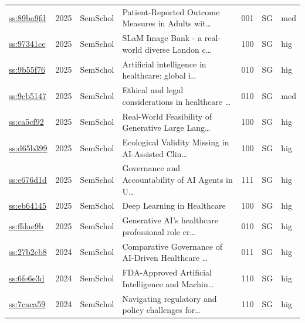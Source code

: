 \begin{table}[p]
\begin{tabularx}{\linewidth}{p{2.2cm} c p{1.4cm} X c p{1cm} p{0.7cm}}
  \href{https://www.semanticscholar.org/paper/89ba9fde2bde295010720131d28cc52f90bda918}{ss:89ba9fd} & 2025 & SemSchol & Patient-Reported Outcome Measures in Adults wit\ldots & 001 & SG & med \\
  \href{https://www.semanticscholar.org/paper/97341ce214d3ee6ff38797b0d31902728279283e}{ss:97341ce} & 2025 & SemSchol & SLaM Image Bank - a real-world diverse London c\ldots & 100 & SG & hig \\
  \href{https://www.semanticscholar.org/paper/9b55f763dac5f72478d0a0cd3b4c8ee4fc8fe3e8}{ss:9b55f76} & 2025 & SemSchol & Artificial intelligence in healthcare: global i\ldots & 010 & SG & hig \\
  \href{https://www.semanticscholar.org/paper/9cb51471e41ddaeaae6f93513f4ce20128248cfd}{ss:9cb5147} & 2025 & SemSchol & Ethical and legal considerations in healthcare \ldots & 010 & SG & med \\
  \href{https://www.semanticscholar.org/paper/ca5cf9264d753c39a709603f8248c048b35de3bf}{ss:ca5cf92} & 2025 & SemSchol & Real-World Feasibility of Generative Large Lang\ldots & 100 & SG & hig \\
  \href{https://www.semanticscholar.org/paper/d65b3997f9ee3728ab5ffb6a999a457914c5320e}{ss:d65b399} & 2025 & SemSchol & Ecological Validity Missing in AI-Assisted Clin\ldots & 100 & SG & hig \\
  \href{https://www.semanticscholar.org/paper/e676d1d843bb4bfc5e4dfa53a8e471b59ae33b8b}{ss:e676d1d} & 2025 & SemSchol & Governance and Accountability of AI Agents in U\ldots & 111 & SG & hig \\
  \href{https://www.semanticscholar.org/paper/eb64145d21ce569267c55569d15b07b6701fe77b}{ss:eb64145} & 2025 & SemSchol & Deep Learning in Healthcare & 100 & SG & hig \\
  \href{https://www.semanticscholar.org/paper/ffdae9b41bd79a5d59beb0f074c7ea9cf893d092}{ss:ffdae9b} & 2025 & SemSchol & Generative AI’s healthcare professional role cr\ldots & 010 & SG & hig \\
  \href{https://www.semanticscholar.org/paper/27b2cb8e59e9f1a728a13d6a0c610cd48cea7a84}{ss:27b2cb8} & 2024 & SemSchol & Comparative Governance of AI-Driven Healthcare \ldots & 011 & SG & hig \\
  \href{https://www.semanticscholar.org/paper/6fe6e3d9ebc672124b43149fb8de1915c8c4796d}{ss:6fe6e3d} & 2024 & SemSchol & FDA-Approved Artificial Intelligence and Machin\ldots & 110 & SG & hig \\
  \href{https://www.semanticscholar.org/paper/7caca59244e1770bfd94d92fe73cce1bde9b05c7}{ss:7caca59} & 2024 & SemSchol & Navigating regulatory and policy challenges for\ldots & 110 & SG & hig \\

\end{tabularx}
\end{table}
